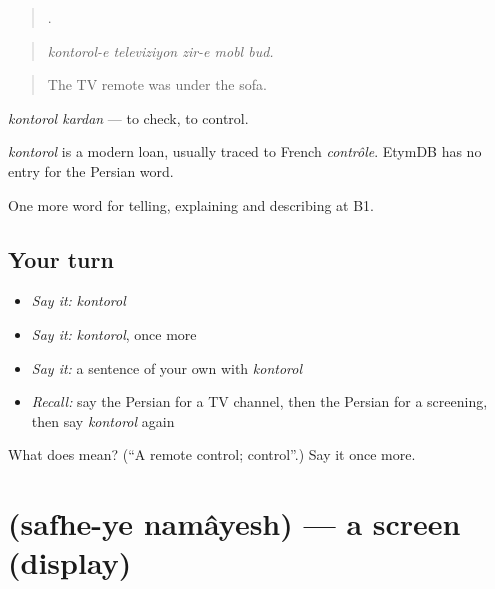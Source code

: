 \begin{quote}
    .
\end{quote}

\begin{quote}
\emph{kontorol-e televiziyon zir-e mobl bud.}
\end{quote}

\begin{quote}
The TV remote was under the sofa.
\end{quote}

\emph{kontorol kardan} — to check, to control.

\begin{cousinweb}
\emph{kontorol} is a modern loan, usually traced to French \emph{contrôle}. EtymDB has no entry for the Persian word.
\end{cousinweb}

\begin{grammarlens}[title={What you've built}]
One more word for telling, explaining and describing at B1.
\end{grammarlens}

\subsection*{Your turn}
\begin{itemize}
\raggedright
  \item \emph{Say it:} \emph{kontorol}
  \item \emph{Say it:} \emph{kontorol}, once more
  \item \emph{Say it:} a sentence of your own with \emph{kontorol}
  \item \emph{Recall:} say the Persian for a TV channel, then the Persian for a screening, then say \emph{kontorol} again
\end{itemize}

\begin{tcolorbox}[breakable,colback=teal!4,colframe=teal!35!black,title={Before you move on}]
What does  mean? (\textquotedblleft{}A remote control; control\textquotedblright{}.) Say it once more.
\end{tcolorbox}
\section[\texorpdfstring{\fa{صفحه} \fa{نمایش} (safhe-ye namâyesh)}{صفحه نمایش (safhe-ye namâyesh)}]{  (safhe-ye namâyesh) — a screen (display)}

